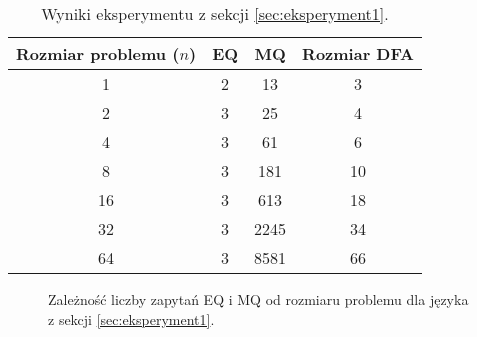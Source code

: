 \begin{table}[h]
\centering
\caption{Wyniki eksperymentu z sekcji \ref{sec:eksperyment1}.}
\label{tab:lstar_prefix}
\begin{tabular}{|c|c|c|c|}
\hline
Rozmiar problemu (\(n\)) & EQ & MQ & Rozmiar DFA \\ \hline
1                        & 2  & 13 & 3           \\ \hline
2                        & 3  & 25 & 4           \\ \hline
4                        & 3  & 61 & 6           \\ \hline
8                        & 3  & 181 & 10         \\ \hline
16                       & 3  & 613 & 18         \\ \hline
32                       & 3  & 2245 & 34        \\ \hline
64                       & 3  & 8581 & 66        \\ \hline
\end{tabular}
\end{table}

\begin{figure}[h]
\centering
{}
\caption{Zależność liczby zapytań EQ i MQ od rozmiaru problemu dla języka z sekcji \ref{sec:eksperyment1}.}
\label{fig:lstar_prefix_mq}
\end{figure}

